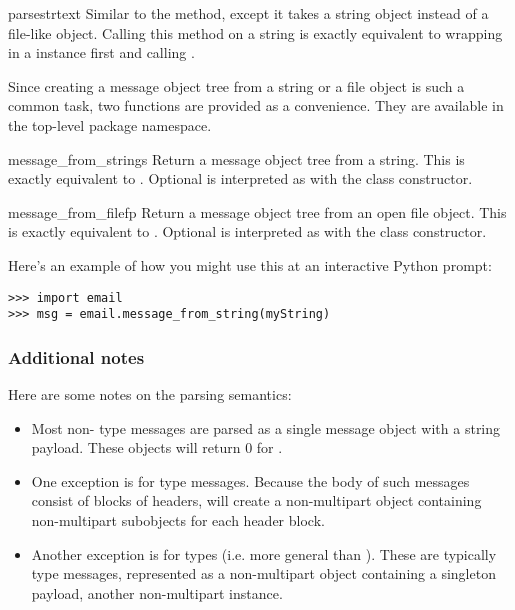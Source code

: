 \begin{methoddesc}[Parser]{parsestr}{text}
Similar to the  method, except it takes a string
object instead of a file-like object.  Calling this method on a string
is exactly equivalent to wrapping  in a 
instance first and calling .
\end{methoddesc}

Since creating a message object tree from a string or a file object is
such a common task, two functions are provided as a convenience.  They
are available in the top-level  package namespace.

\begin{funcdesc}{message_from_string}{s}
Return a message object tree from a string.  This is exactly
equivalent to .  Optional  is
interpreted as with the  class constructor.
\end{funcdesc}

\begin{funcdesc}{message_from_file}{fp}
Return a message object tree from an open file object.  This is exactly
equivalent to .  Optional  is
interpreted as with the  class constructor.
\end{funcdesc}

Here's an example of how you might use this at an interactive Python
prompt:

\begin{verbatim}
>>> import email
>>> msg = email.message_from_string(myString)
\end{verbatim}

\subsubsection{Additional notes}

Here are some notes on the parsing semantics:

\begin{itemize}
\item Most non- type messages are parsed as a single
      message object with a string payload.  These objects will return
      0 for .
\item One exception is for  type
      messages.  Because the body of such messages consist of
      blocks of headers,  will create a non-multipart
      object containing non-multipart subobjects for each header
      block.
\item Another exception is for  types (i.e. more
      general than ).  These are
      typically  type messages, represented as a
      non-multipart object containing a singleton payload, another
      non-multipart  instance.
\end{itemize}

